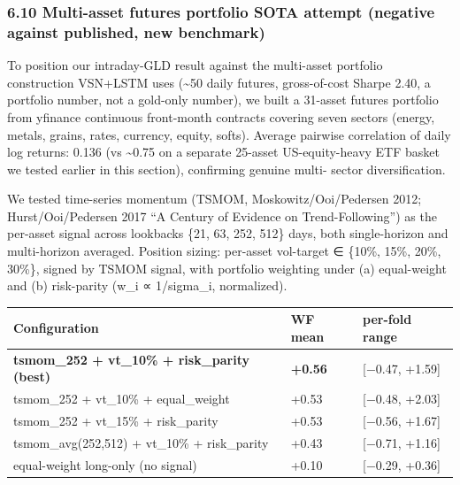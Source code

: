 \documentclass[
]{article}
\newcounter{none} %
\begin{document}
\subsubsection{6.10 Multi-asset futures portfolio SOTA attempt (negative
against published, new
benchmark)}\label{multi-asset-futures-portfolio-sota-attempt-negative-against-published-new-benchmark}

To position our intraday-GLD result against the multi-asset portfolio
construction VSN+LSTM uses (\textasciitilde50 daily futures,
gross-of-cost Sharpe 2.40, a portfolio number, not a gold-only number),
we built a 31-asset futures portfolio from yfinance continuous
front-month contracts covering seven sectors (energy, metals, grains,
rates, currency, equity, softs). Average pairwise correlation of daily
log returns: 0.136 (vs \textasciitilde0.75 on a separate 25-asset
US-equity-heavy ETF basket we tested earlier in this section),
confirming genuine multi- sector diversification.

We tested time-series momentum (TSMOM, Moskowitz/Ooi/Pedersen 2012;
Hurst/Ooi/Pedersen 2017 ``A Century of Evidence on Trend-Following'') as
the per-asset signal across lookbacks \{21, 63, 252, 512\} days, both
single-horizon and multi-horizon averaged. Position sizing: per-asset
vol-target ∈ \{10\%, 15\%, 20\%, 30\%\}, signed by TSMOM signal, with
portfolio weighting under (a) equal-weight and (b) risk-parity (w\_i ∝
1/sigma\_i, normalized).

{\def\LTcaptype{none} %
\begin{longtable}[]{@{}
  >{\raggedright\arraybackslash}p{}
  >{\raggedleft\arraybackslash}p{}
  >{\raggedleft\arraybackslash}p{}@{}}
\toprule\noalign{}
\begin{minipage}[b]{\linewidth}\raggedright
Configuration
\end{minipage} & \begin{minipage}[b]{\linewidth}\raggedleft
WF mean
\end{minipage} & \begin{minipage}[b]{\linewidth}\raggedleft
per-fold range
\end{minipage} \\
\midrule\noalign{}
\endhead
\bottomrule\noalign{}
\endlastfoot
\textbf{tsmom\_252 + vt\_10\% + risk\_parity (best)} & \textbf{+0.56} &
{[}−0.47, +1.59{]} \\
tsmom\_252 + vt\_10\% + equal\_weight & +0.53 & {[}−0.48, +2.03{]} \\
tsmom\_252 + vt\_15\% + risk\_parity & +0.53 & {[}−0.56, +1.67{]} \\
tsmom\_avg(252,512) + vt\_10\% + risk\_parity & +0.43 & {[}−0.71,
+1.16{]} \\
equal-weight long-only (no signal) & +0.10 & {[}−0.29, +0.36{]} \\
\end{longtable}
}
\end{document}
